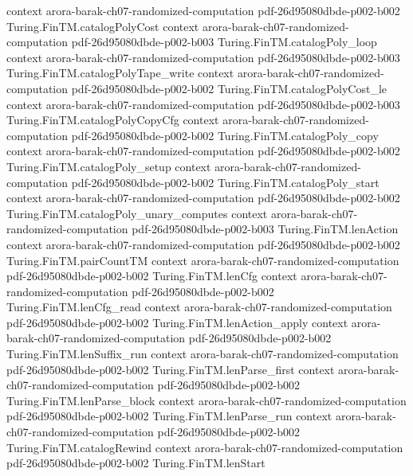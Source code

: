 \begin{theorem}
  {context}
  {arora-barak-ch07-randomized-computation}
  {pdf-26d95080dbde-p002-b002}
\proofstep
  {Turing.FinTM.catalogPolyCost}
  {context}
  {arora-barak-ch07-randomized-computation}
  {pdf-26d95080dbde-p002-b003}
\proofstep
  {Turing.FinTM.catalogPoly_loop}
  {context}
  {arora-barak-ch07-randomized-computation}
  {pdf-26d95080dbde-p002-b003}
\proofstep
  {Turing.FinTM.catalogPolyTape_write}
  {context}
  {arora-barak-ch07-randomized-computation}
  {pdf-26d95080dbde-p002-b002}
\proofstep
  {Turing.FinTM.catalogPolyCost_le}
  {context}
  {arora-barak-ch07-randomized-computation}
  {pdf-26d95080dbde-p002-b003}
\proofstep
  {Turing.FinTM.catalogPolyCopyCfg}
  {context}
  {arora-barak-ch07-randomized-computation}
  {pdf-26d95080dbde-p002-b002}
\proofstep
  {Turing.FinTM.catalogPoly_copy}
  {context}
  {arora-barak-ch07-randomized-computation}
  {pdf-26d95080dbde-p002-b002}
\proofstep
  {Turing.FinTM.catalogPoly_setup}
  {context}
  {arora-barak-ch07-randomized-computation}
  {pdf-26d95080dbde-p002-b002}
\proofstep
  {Turing.FinTM.catalogPoly_start}
  {context}
  {arora-barak-ch07-randomized-computation}
  {pdf-26d95080dbde-p002-b002}
\proofstep
  {Turing.FinTM.catalogPoly_unary_computes}
  {context}
  {arora-barak-ch07-randomized-computation}
  {pdf-26d95080dbde-p002-b003}
\proofstep
  {Turing.FinTM.lenAction}
  {context}
  {arora-barak-ch07-randomized-computation}
  {pdf-26d95080dbde-p002-b002}
\proofstep
  {Turing.FinTM.pairCountTM}
  {context}
  {arora-barak-ch07-randomized-computation}
  {pdf-26d95080dbde-p002-b002}
\proofstep
  {Turing.FinTM.lenCfg}
  {context}
  {arora-barak-ch07-randomized-computation}
  {pdf-26d95080dbde-p002-b002}
\proofstep
  {Turing.FinTM.lenCfg_read}
  {context}
  {arora-barak-ch07-randomized-computation}
  {pdf-26d95080dbde-p002-b002}
\proofstep
  {Turing.FinTM.lenAction_apply}
  {context}
  {arora-barak-ch07-randomized-computation}
  {pdf-26d95080dbde-p002-b002}
\proofstep
  {Turing.FinTM.lenSuffix_run}
  {context}
  {arora-barak-ch07-randomized-computation}
  {pdf-26d95080dbde-p002-b002}
\proofstep
  {Turing.FinTM.lenParse_first}
  {context}
  {arora-barak-ch07-randomized-computation}
  {pdf-26d95080dbde-p002-b002}
\proofstep
  {Turing.FinTM.lenParse_block}
  {context}
  {arora-barak-ch07-randomized-computation}
  {pdf-26d95080dbde-p002-b002}
\proofstep
  {Turing.FinTM.lenParse_run}
  {context}
  {arora-barak-ch07-randomized-computation}
  {pdf-26d95080dbde-p002-b002}
\proofstep
  {Turing.FinTM.catalogRewind}
  {context}
  {arora-barak-ch07-randomized-computation}
  {pdf-26d95080dbde-p002-b002}
\proofstep
  {Turing.FinTM.lenStart}

\end{theorem}
